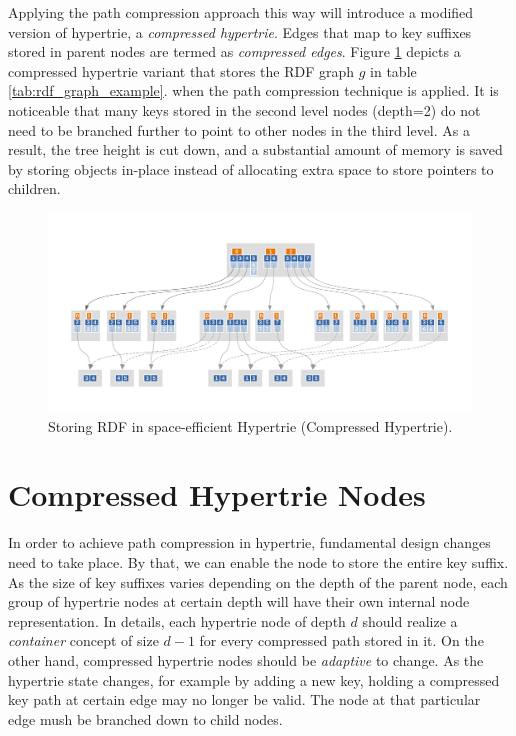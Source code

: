Applying the path compression approach this way will introduce a modified version of hypertrie, a \textit{compressed hypertrie}. Edges that map to key suffixes stored in parent nodes are termed as \textit{compressed edges}. 
Figure \ref{fig:rdf_compressed_hypertrie} depicts a compressed hypertrie variant that stores the RDF graph $g$ in table \ref{tab:rdf_graph_example}.
when the path compression technique is applied. It is noticeable that many keys stored in the second level nodes (depth=2) do not need to be branched further to point to other nodes in the third level. 
As a result, the tree height is cut down, and a substantial amount of memory is saved by storing objects in-place instead of allocating extra space to store pointers to children. 

\begin{figure}
	\centering
	\includegraphics[scale=0.74]{figures/chapter4/compressedBHT}
	\caption{Storing RDF in space-efficient Hypertrie (Compressed Hypertrie).}
	\label{fig:rdf_compressed_hypertrie}
\end{figure}


\section{Compressed Hypertrie Nodes}
\label{sec:compressed_nodes_representation}
In order to achieve path compression in hypertrie, fundamental design changes need to take place. By that, we can enable the node to store the entire key suffix.
As the size of key suffixes varies depending on the depth of the parent node, each group of hypertrie nodes at certain depth will have their own internal node representation. In details, each hypertrie node of depth $d$ should realize a \textit{container} concept of size $d-1$ for every compressed path stored in it. On the other hand, compressed hypertrie nodes should be \textit{adaptive} to change. As the hypertrie state changes, for example by adding a new key, holding a compressed key path at certain edge may no longer be valid. The node at that particular edge mush be branched down to child nodes. \\

